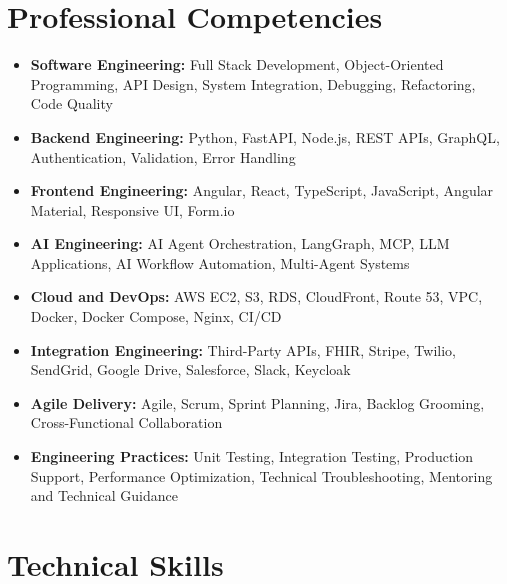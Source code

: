 \documentclass[10pt,a4paper]{article}
\begin{document}
\section*{Professional Competencies}

\begin{itemize}
    \item \textbf{Software Engineering:} Full Stack Development, Object-Oriented Programming, API Design, System Integration, Debugging, Refactoring, Code Quality

    \item \textbf{Backend Engineering:} Python, FastAPI, Node.js, REST APIs, GraphQL, Authentication, Validation, Error Handling

    \item \textbf{Frontend Engineering:} Angular, React, TypeScript, JavaScript, Angular Material, Responsive UI, Form.io

    \item \textbf{AI Engineering:} AI Agent Orchestration, LangGraph, MCP, LLM Applications, AI Workflow Automation, Multi-Agent Systems

    \item \textbf{Cloud and DevOps:} AWS EC2, S3, RDS, CloudFront, Route 53, VPC, Docker, Docker Compose, Nginx, CI/CD

    \item \textbf{Integration Engineering:} Third-Party APIs, FHIR, Stripe, Twilio, SendGrid, Google Drive, Salesforce, Slack, Keycloak

    \item \textbf{Agile Delivery:} Agile, Scrum, Sprint Planning, Jira, Backlog Grooming, Cross-Functional Collaboration

    \item \textbf{Engineering Practices:} Unit Testing, Integration Testing, Production Support, Performance Optimization, Technical Troubleshooting, Mentoring and Technical Guidance
\end{itemize}

\section*{Technical Skills}
\end{document}
